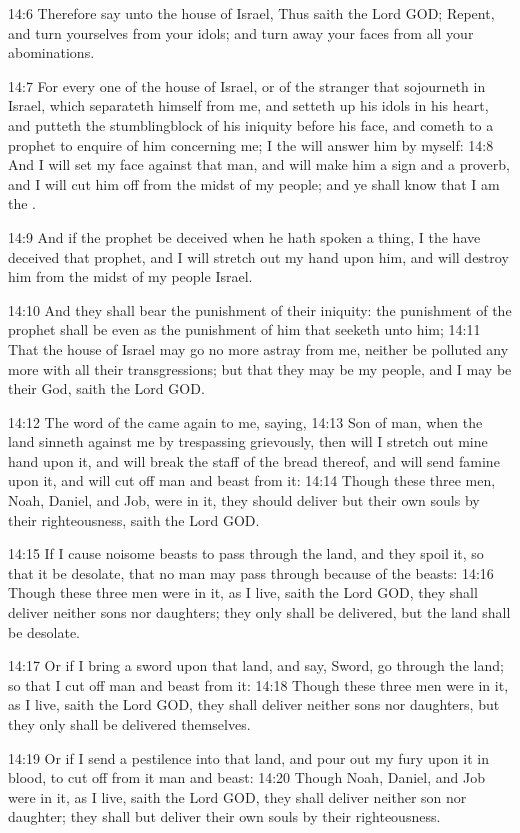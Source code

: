 14:6 Therefore say unto the house of Israel, Thus saith the Lord GOD;
Repent, and turn yourselves from your idols; and turn away your faces
from all your abominations.

14:7 For every one of the house of Israel, or of the stranger that
sojourneth in Israel, which separateth himself from me, and setteth up
his idols in his heart, and putteth the stumblingblock of his iniquity
before his face, and cometh to a prophet to enquire of him concerning
me; I the \LORD will answer him by myself: 14:8 And I will set my face
against that man, and will make him a sign and a proverb, and I will
cut him off from the midst of my people; and ye shall know that I am
the \LORD.

14:9 And if the prophet be deceived when he hath spoken a thing, I the
\LORD have deceived that prophet, and I will stretch out my hand upon
him, and will destroy him from the midst of my people Israel.

14:10 And they shall bear the punishment of their iniquity: the
punishment of the prophet shall be even as the punishment of him that
seeketh unto him; 14:11 That the house of Israel may go no more astray
from me, neither be polluted any more with all their transgressions;
but that they may be my people, and I may be their God, saith the Lord
GOD.

14:12 The word of the \LORD came again to me, saying, 14:13 Son of man,
when the land sinneth against me by trespassing grievously, then will
I stretch out mine hand upon it, and will break the staff of the bread
thereof, and will send famine upon it, and will cut off man and beast
from it: 14:14 Though these three men, Noah, Daniel, and Job, were in
it, they should deliver but their own souls by their righteousness,
saith the Lord GOD.

14:15 If I cause noisome beasts to pass through the land, and they
spoil it, so that it be desolate, that no man may pass through because
of the beasts: 14:16 Though these three men were in it, as I live,
saith the Lord GOD, they shall deliver neither sons nor daughters;
they only shall be delivered, but the land shall be desolate.

14:17 Or if I bring a sword upon that land, and say, Sword, go through
the land; so that I cut off man and beast from it: 14:18 Though these
three men were in it, as I live, saith the Lord GOD, they shall
deliver neither sons nor daughters, but they only shall be delivered
themselves.

14:19 Or if I send a pestilence into that land, and pour out my fury
upon it in blood, to cut off from it man and beast: 14:20 Though Noah,
Daniel, and Job were in it, as I live, saith the Lord GOD, they shall
deliver neither son nor daughter; they shall but deliver their own
souls by their righteousness.

